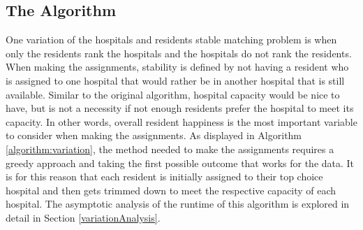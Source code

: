 \documentclass[letterpaper, 10pt,DIV=13]{scrartcl}
\numberwithin{equation}{section} %
\numberwithin{figure}{section} %
\numberwithin{table}{section} %
\begin{document}
\subsection{The Algorithm}
One variation of the hospitals and residents stable matching problem is when only the residents rank the hospitals and the hospitals do not rank the residents. When making the assignments, stability is defined by not having a resident who is assigned to one hospital that would rather be in another hospital that is still available. Similar to the original algorithm, hospital capacity would be nice to have, but is not a necessity if not enough residents prefer the hospital to meet its capacity. In other words, overall resident happiness is the most important variable to consider when making the assignments. As displayed in Algorithm \ref{algorithm:variation}, the method needed to make the assignments requires a greedy approach and taking the first possible outcome that works for the data. It is for this reason that each resident is initially assigned to their top choice hospital and then gets trimmed down to meet the respective capacity of each hospital. The asymptotic analysis of the runtime of this algorithm is explored in detail in Section \ref{variationAnalysis}.
\end{document}
